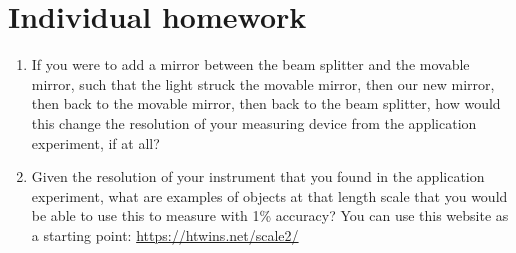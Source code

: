 \section{Individual homework}

\begin{enumerate}
	\item If you were to add a mirror between the beam splitter and the movable mirror, such that the light struck the movable mirror, then our new mirror, then back to the movable mirror, then back to the beam splitter, how would this change the resolution of your measuring device from the application experiment, if at all?
	
	\item Given the resolution of your instrument that you found in the application experiment, what are examples of objects at that length scale that you would be able to use this to measure with 1\% accuracy? You can use this website as a starting point: \url{https://htwins.net/scale2/}
\end{enumerate}